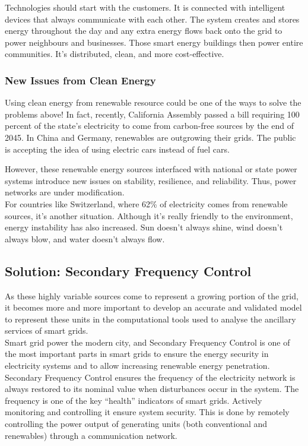 Technologies should start with the customers. It is connected with intelligent devices that always communicate with each other. The system creates and stores energy throughout the day and any extra energy flows back onto the grid to power neighbours and businesses. Those smart energy buildings then power entire communities. It’s distributed, clean, and more cost-effective. 

\subsubsection{New Issues from Clean Energy}
Using clean energy from renewable resource could be one of the ways to solve the problems above! In fact, recently, California Assembly passed a bill requiring 100 percent of the state’s electricity to come from carbon-free sources by the end of 2045. In China and Germany, renewables are outgrowing their grids. The public is accepting the idea of using electric cars instead of fuel cars. 

However, these renewable energy sources interfaced with national or state power systems introduce new issues on stability, resilience, and reliability. Thus, power networks are under modification.\\

For countries like Switzerland, where 62\% of electricity comes from renewable sources, it’s another situation. Although it’s really friendly to the environment, energy instability has also increased. Sun doesn’t always shine, wind doesn’t always blow, and water doesn’t always flow. 

\subsection{Solution: Secondary Frequency Control}
As these highly variable sources come to represent a growing portion of the grid, it becomes more and more important to develop an accurate and validated model to represent these units in the computational tools used to analyse the ancillary services of smart grids.\\

Smart grid power the modern city, and Secondary Frequency Control is one of the most important parts in smart grids to ensure the energy security in electricity systems and to allow increasing renewable energy penetration. Secondary Frequency Control ensures the frequency of the electricity network is always restored to its nominal value when disturbances occur in the system. The frequency is one of the key “health” indicators of smart grids. Actively monitoring and controlling it ensure system security. This is done by remotely controlling the power output of generating units (both conventional and renewables) through a communication network. 